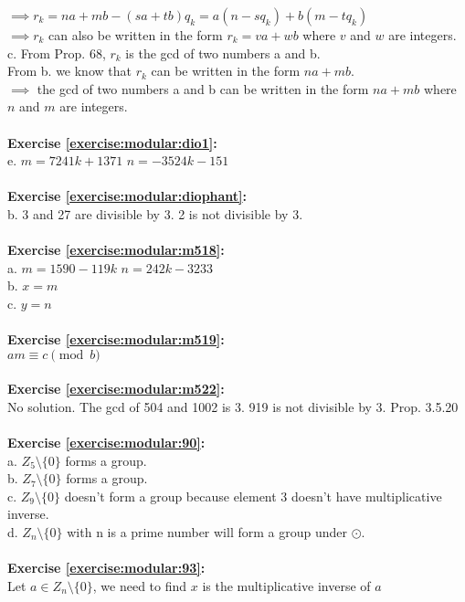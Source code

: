$\implies r_k=na+mb-(sa+tb)q_k=a(n-sq_k)+b(m-tq_k)$\\
$\implies r_k$ can also be written in the form $r_k=va+wb$ where $v$ and $w$ are integers.\\
c. From Prop. 68, $r_k$ is the gcd of two numbers a and b.\\
From b. we know that $r_k$ can be written in the form $na+mb$.\\
$\implies$  the gcd of two numbers a and b can be written in the form $na+mb$ where $n$ and $m$ are integers.\\
\\
\textbf{Exercise \ref{exercise:modular:dio1}:}\\
e. $m=7241k+1371$ $n=-3524k-151$\\
\\
\textbf{Exercise \ref{exercise:modular:diophant}:}\\
b. 3 and 27 are divisible by 3. 2 is not divisible by 3.\\
\\
\textbf{Exercise \ref{exercise:modular:m518}:}\\%
a. $m=1590-119k$ $n=242k-3233$\\
b. $x=m$\\
c. $y=n$\\
\\
\textbf{Exercise \ref{exercise:modular:m519}:}\\%
$am \equiv c \pmod{b}$\\
\\
\textbf{Exercise \ref{exercise:modular:m522}:}\\%
No solution. The gcd of 504 and 1002 is 3. 919 is not divisible by 3. Prop. 3.5.20\\
\\
\textbf{Exercise \ref{exercise:modular:90}:}\\
a. $Z_5 \setminus \{0\}$ forms a group.\\
b. $Z_7 \setminus \{0\}$ forms a group.\\
c. $Z_9 \setminus \{0\}$ doesn't form a group because element 3 doesn't have multiplicative inverse.\\
d. $Z_n \setminus \{0\}$ with n is a prime number will form a group under $\odot$.\\
\\
\textbf{Exercise \ref{exercise:modular:93}:}\\
Let $a \in Z_n \setminus \{0\}$, we need to find $x$ is the multiplicative inverse of $a$\\
